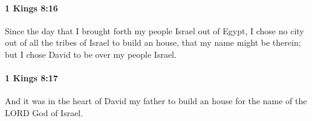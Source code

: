 		\paragraph{1 Kings 8:16} %
			\label{1KINGS-8-16}

			Since the day that I brought forth my people Israel out of Egypt, I chose no city out of all the tribes of Israel to build an house, that my name might be therein; but I chose David to be over my people Israel.


		\paragraph{1 Kings 8:17} %
			\label{1KINGS-8-17}

			And it was in the heart of David my father to build an house for the name of the LORD God of Israel.


